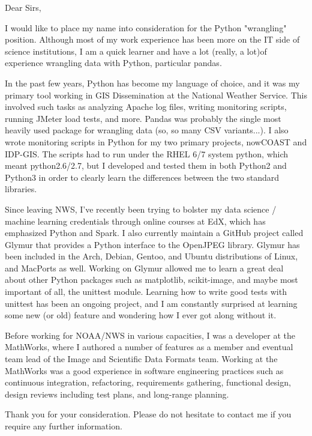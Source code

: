 Dear Sirs,

I would like to place my name into consideration for the Python "wrangling" position.  Although most of my work experience has been more on the IT side of science institutions, I am a quick learner and have a lot (really, a lot)of experience wrangling data with Python, particular pandas.

In the past few years, Python has become my language of choice, and it was my primary tool working in GIS Dissemination at the National Weather Service.  This involved such tasks as analyzing Apache log files, writing monitoring scripts, running JMeter load tests, and more.  Pandas was probably the single most heavily used package for wrangling data (so, so many CSV variants...).  I also wrote monitoring scripts in Python for my two primary projects, nowCOAST and IDP-GIS.  The scripts had to run under the RHEL 6/7 system python, which meant python2.6/2.7, but I developed and tested them in both Python2 and Python3 in order to clearly learn the differences between the two standard libraries.

Since leaving NWS, I've recently been trying to bolster my data science / machine learning credentials through online courses at EdX, which has emphasized Python and Spark.  I also currently maintain a GitHub project called Glymur that provides a Python interface to the OpenJPEG library.  Glymur has been included in the Arch, Debian, Gentoo, and Ubuntu distributions of Linux, and MacPorts as well.  Working on Glymur allowed me to learn a great deal about other Python packages such as matplotlib, scikit-image, and maybe most important of all, the unittest module.  Learning how to write good tests with unittest has been an ongoing project, and I am constantly surprised at learning some new (or old) feature and wondering how I ever got along without it.

Before working for NOAA/NWS in various capacities, I was a developer at the MathWorks, where I authored a number of features as a member and eventual team lead of the Image and Scientific Data Formats team.  Working at the MathWorks was a good experience in software engineering practices such as continuous integration, refactoring, requirements gathering, functional design, design reviews including test plans, and long-range planning.

Thank you for your consideration.  Please do not hesitate to contact me if you require any further information.

